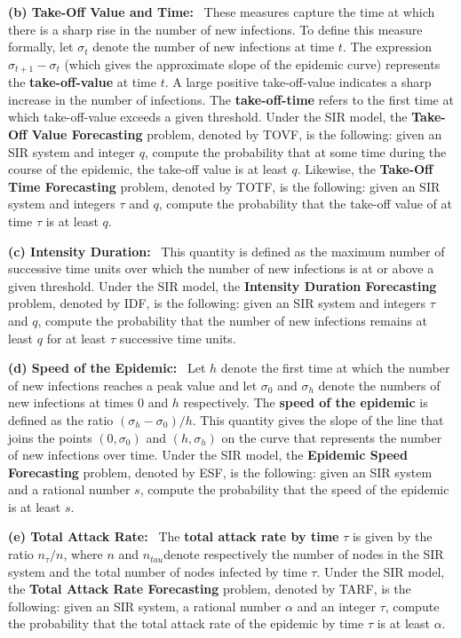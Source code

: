 \medskip
\noindent
\textbf{(b) Take-Off Value and Time:}~ These measures 
capture the time at which there is a sharp rise in the 
number of new infections. 
To define this measure formally,
let $\sigma_t$ denote the number of new infections at time $t$.
The expression $\sigma_{t+1} - \sigma_t$ (which gives the approximate
slope of the epidemic curve) represents the \textbf{take-off-value} at time $t$.
A large positive take-off-value indicates a sharp increase 
in the number of infections.
The \textbf{take-off-time} refers to the first time at which
take-off-value exceeds a given threshold.
Under the SIR model, the \textbf{Take-Off Value Forecasting} problem, denoted by
TOVF, is the following: given an SIR system and integer $q$, compute
the probability that at some time during the course
of the epidemic, the take-off value is at least $q$.
Likewise, the \textbf{Take-Off Time Forecasting} problem, denoted by
TOTF, is the following: given an SIR system and integers $\tau$ and $q$, compute
the probability that the take-off value of at time $\tau$ is at least $q$.

\medskip
\noindent
\textbf{(c) Intensity Duration:}~ This quantity is defined as the maximum 
number of successive
time units over which the number of new infections is at or above a given threshold. 
Under the SIR model, the \textbf{Intensity Duration Forecasting} problem, denoted by
IDF, is the following: given an SIR system and integers $\tau$ and $q$, compute
the probability that the number of new infections remains at least $q$ for at least
$\tau$ successive time units.  

\medskip
\noindent
\textbf{(d) Speed of the Epidemic:}~ Let $h$ denote the first
time at which the number of new infections reaches a peak value and let  $\sigma_0$
and $\sigma_h$ denote the numbers of new infections at times 0 and $h$ respectively.
The \textbf{speed of the epidemic} is defined as the ratio $(\sigma_h - \sigma_0)/h$.
This quantity gives the slope of the line that joins the points $(0, \sigma_0)$ and
$(h, \sigma_h)$ on the curve that represents the number of new infections over time.
Under the SIR model, the \textbf{Epidemic Speed Forecasting} problem, 
denoted by ESF, is the following:
given an SIR system and a rational number $s$, compute the probability that the speed
of the epidemic is at least $s$.

\medskip
\noindent
\textbf{(e) Total Attack Rate:}~ The \textbf{total attack rate by time} $\tau$
is given by the ratio $n_{\tau}/n$, 
where $n$ and $n_{tau}$denote respectively the number of nodes 
in the SIR system and the total number of nodes infected by time $\tau$. 
Under the SIR model, the \textbf{Total Attack Rate Forecasting} problem, 
denoted by TARF, is the following:
given an SIR system, a rational number $\alpha$ and an integer $\tau$, 
compute the probability that the total attack rate of the epidemic 
by time $\tau$ is at least $\alpha$.

